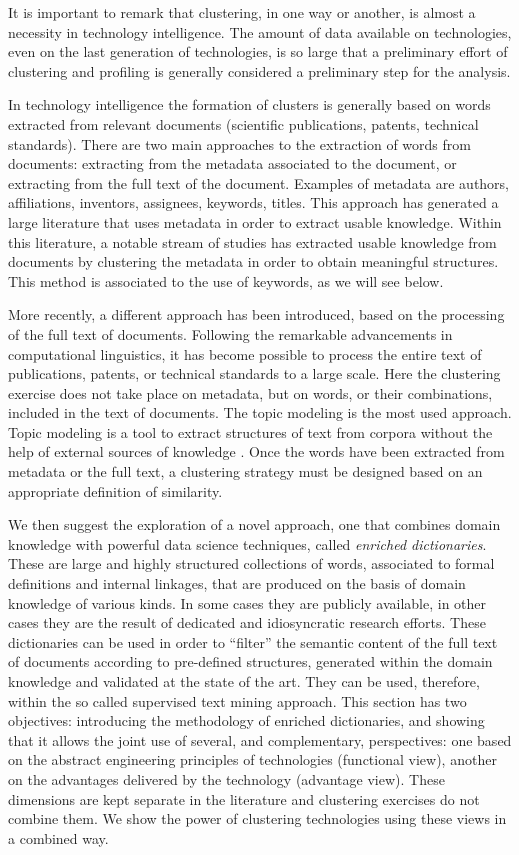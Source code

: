 \documentclass[b5paper,]{book}
\theoremstyle{definition}
\theoremstyle{definition}
\theoremstyle{definition}
\theoremstyle{remark}
\begin{document}
It is important to remark that clustering, in one way or another, is
almost a necessity in technology intelligence. The amount of data
available on technologies, even on the last generation of technologies,
is so large that a preliminary effort of clustering and profiling is
generally considered a preliminary step for the analysis.

In technology intelligence the formation of clusters is generally based
on words extracted from relevant documents (scientific publications,
patents, technical standards). There are two main approaches to the
extraction of words from documents: extracting from the metadata
associated to the document, or extracting from the full text of the
document. Examples of metadata are authors, affiliations, inventors,
assignees, keywords, titles. This approach has generated a large
literature that uses metadata in order to extract usable knowledge.
Within this literature, a notable stream of studies has extracted usable
knowledge from documents by clustering the metadata in order to obtain
meaningful structures. This method is associated to the use of keywords,
as we will see below.

More recently, a different approach has been introduced, based on the
processing of the full text of documents. Following the remarkable
advancements in computational linguistics, it has become possible to
process the entire text of publications, patents, or technical standards
to a large scale. Here the clustering exercise does not take place on
metadata, but on words, or their combinations, included in the text of
documents. The topic modeling is the most used approach. Topic modeling
is a tool to extract structures of text from corpora without the help of
external sources of knowledge \citep{blei2003latent}. Once the words
have been extracted from metadata or the full text, a clustering
strategy must be designed based on an appropriate definition of
similarity.

We then suggest the exploration of a novel approach, one that combines
domain knowledge with powerful data science techniques, called
\emph{enriched dictionaries}. These are large and highly structured
collections of words, associated to formal definitions and internal
linkages, that are produced on the basis of domain knowledge of various
kinds. In some cases they are publicly available, in other cases they
are the result of dedicated and idiosyncratic research efforts. These
dictionaries can be used in order to ``filter'' the semantic content of
the full text of documents according to pre-defined structures,
generated within the domain knowledge and validated at the state of the
art. They can be used, therefore, within the so called supervised text
mining approach. This section has two objectives: introducing the
methodology of enriched dictionaries, and showing that it allows the
joint use of several, and complementary, perspectives: one based on the
abstract engineering principles of technologies (functional view),
another on the advantages delivered by the technology (advantage view).
These dimensions are kept separate in the literature and clustering
exercises do not combine them. We show the power of clustering
technologies using these views in a combined way.
\end{document}
